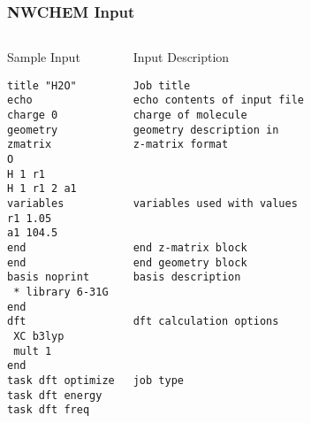 \documentclass[slidestop,mathserif,compress,xcolor=svgnames]{beamer}
\begin{document}
\begin{frame}[fragile]
\frametitle{\small NWCHEM Input}
\tiny{
\begin{columns}
\column{6.5cm}
\begin{block}{Sample Input}
\begin{verbatim}
title "H2O"
echo
charge 0
geometry
zmatrix
O
H 1 r1
H 1 r1 2 a1
variables
r1 1.05 
a1 104.5
end
end
basis noprint
 * library 6-31G
end
dft
 XC b3lyp
 mult 1
end
task dft optimize
task dft energy
task dft freq
\end{verbatim}
\end{block}
\column{5cm}
{\color{tigersblue}
\begin{alertblock}{Input Description}
\begin{verbatim}
Job title
echo contents of input file
charge of molecule
geometry description in
z-matrix format



variables used with values
 

end z-matrix block
end geometry block
basis description
 
 
dft calculation options
 
 

job type


\end{verbatim}
\end{alertblock}
}
\end{columns}
}
\end{frame}
\end{document}

